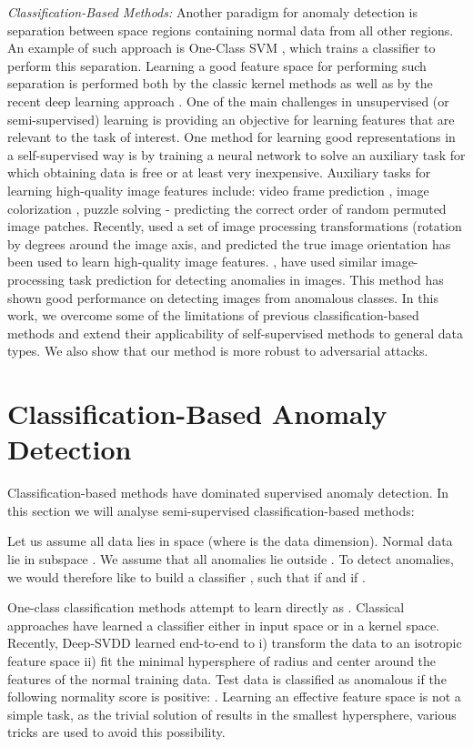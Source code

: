 \documentclass{article} \usepackage{iclr2020_conference,times}
\begin{document}
\textit{Classification-Based Methods:} Another paradigm for anomaly detection is separation between space regions containing normal data from all other regions. An example of such approach is One-Class SVM \citep{scholkopf2000support}, which trains a classifier to perform this separation. Learning a good feature space for performing such separation is performed both by the classic kernel methods as well as by the recent deep learning approach \citep{ruff2018deep}. One of the main challenges in unsupervised (or semi-supervised) learning is providing an objective for learning features that are relevant to the task of interest. One method for learning good representations in a self-supervised way is by training a neural network to solve an auxiliary task for which obtaining data is free or at least very inexpensive. Auxiliary tasks for learning high-quality image features include: video frame prediction \citep{mathieu2015deep}, image colorization \citep{zhang2016colorful, larsson2016learning}, puzzle solving \citep{noroozi2016unsupervised} - predicting the correct order of random permuted image patches. Recently, \cite{gidaris2018unsupervised} used a set of image processing transformations (rotation by  degrees around the image axis, and predicted the true image orientation has been used to learn high-quality image features. \cite{golan2018deep}, have used similar image-processing task prediction for detecting anomalies in images. This method has shown good performance on detecting images from anomalous classes. In this work, we overcome some of the limitations of previous classification-based methods and extend their applicability of self-supervised methods to general data types. We also show that our method is more robust to adversarial attacks.

\section{Classification-Based Anomaly Detection}
\label{sec:analysis_class}

Classification-based methods have dominated supervised anomaly detection. In this section we will analyse semi-supervised classification-based methods:

Let us assume all data lies in space  (where  is the data dimension). Normal data lie in subspace . We assume that all anomalies lie outside . To detect anomalies, we would therefore like to build a classifier , such that  if  and  if .

One-class classification methods attempt to learn  directly as . Classical approaches have learned a classifier either in input space or in a kernel space. Recently, Deep-SVDD \citep{ruff2018deep} learned end-to-end to i) transform the data to an isotropic feature space  ii) fit the minimal hypersphere of radius  and center  around the features of the normal training data. Test data is classified as anomalous if the following normality score is positive: . Learning an effective feature space is not a simple task, as the trivial solution of  results in the smallest hypersphere,  various tricks are used to avoid this possibility.
\end{document}
